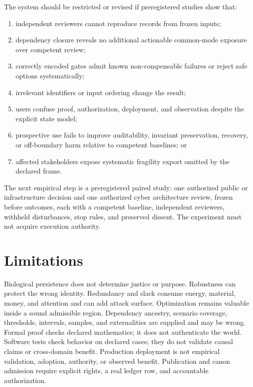 \documentclass[10pt]{article}
\begin{document}
The system should be restricted or revised if preregistered studies show that:
\begin{enumerate}
\item independent reviewers cannot reproduce records from frozen inputs;
\item dependency closure reveals no additional actionable common-mode exposure
over competent review;
\item correctly encoded gates admit known non-compensable failures or reject
safe options systematically;
\item irrelevant identifiers or input ordering change the result;
\item users confuse proof, authorization, deployment, and observation despite
the explicit state model;
\item prospective use fails to improve auditability, invariant preservation,
recovery, or off-boundary harm relative to competent baselines; or
\item affected stakeholders expose systematic fragility export omitted by the
declared frame.
\end{enumerate}

The next empirical step is a preregistered paired study: one authorized public
or infrastructure decision and one authorized cyber architecture review,
frozen before outcomes, each with a competent baseline, independent reviewers,
withheld disturbances, stop rules, and preserved dissent. The experiment must
not acquire execution authority.

\section{Limitations}

Biological persistence does not determine justice or purpose. Robustness can
protect the wrong identity. Redundancy and slack consume energy, material,
money, and attention and can add attack surface. Optimization remains valuable
inside a sound admissible region. Dependency ancestry, scenario coverage,
thresholds, intervals, samples, and externalities are supplied and may be
wrong. Formal proof checks declared mathematics; it does not authenticate the
world. Software tests check behavior on declared cases; they do not validate
causal claims or cross-domain benefit. Production deployment is not empirical
validation, adoption, authority, or observed benefit. Publication and canon
admission require explicit rights, a real ledger row, and accountable
authorization.
\end{document}
